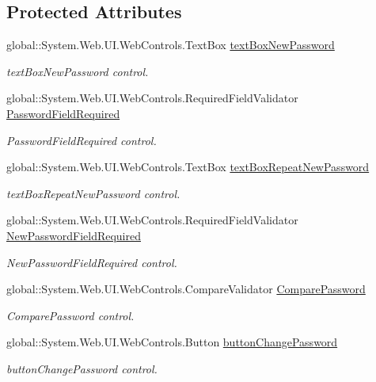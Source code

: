 \subsection*{Protected Attributes}
\begin{DoxyCompactItemize}
\item 
global\+::\+System.\+Web.\+U\+I.\+Web\+Controls.\+Text\+Box \mbox{\hyperlink{classWebApplication_1_1CambiarPassword_af57b154b17144a229bb1a89b02945d04}{text\+Box\+New\+Password}}
\begin{DoxyCompactList}\small\item\em text\+Box\+New\+Password control. \end{DoxyCompactList}\item 
global\+::\+System.\+Web.\+U\+I.\+Web\+Controls.\+Required\+Field\+Validator \mbox{\hyperlink{classWebApplication_1_1CambiarPassword_a2f09ba1ca6615f1c27eab33acf1d660d}{Password\+Field\+Required}}
\begin{DoxyCompactList}\small\item\em Password\+Field\+Required control. \end{DoxyCompactList}\item 
global\+::\+System.\+Web.\+U\+I.\+Web\+Controls.\+Text\+Box \mbox{\hyperlink{classWebApplication_1_1CambiarPassword_a4db4322109a3840647ddabf2a508c42e}{text\+Box\+Repeat\+New\+Password}}
\begin{DoxyCompactList}\small\item\em text\+Box\+Repeat\+New\+Password control. \end{DoxyCompactList}\item 
global\+::\+System.\+Web.\+U\+I.\+Web\+Controls.\+Required\+Field\+Validator \mbox{\hyperlink{classWebApplication_1_1CambiarPassword_a3ebddb7e47e8ff7b0221fe69137aeb40}{New\+Password\+Field\+Required}}
\begin{DoxyCompactList}\small\item\em New\+Password\+Field\+Required control. \end{DoxyCompactList}\item 
global\+::\+System.\+Web.\+U\+I.\+Web\+Controls.\+Compare\+Validator \mbox{\hyperlink{classWebApplication_1_1CambiarPassword_a3fc2ada75f8161ccd3708ad44d98a0be}{Compare\+Password}}
\begin{DoxyCompactList}\small\item\em Compare\+Password control. \end{DoxyCompactList}\item 
global\+::\+System.\+Web.\+U\+I.\+Web\+Controls.\+Button \mbox{\hyperlink{classWebApplication_1_1CambiarPassword_aa8f164fc829e197e0c1ae3f47e1881bf}{button\+Change\+Password}}
\begin{DoxyCompactList}\small\item\em button\+Change\+Password control. \end{DoxyCompactList}\end{DoxyCompactItemize}


